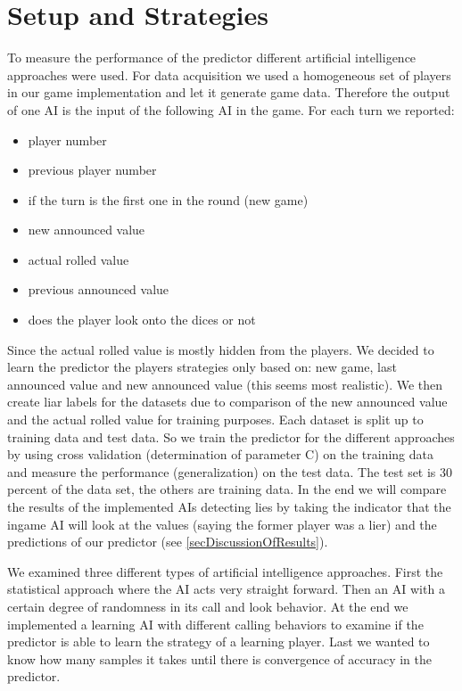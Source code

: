 \documentclass[11pt]{article}
\begin{document}
\section{Setup and Strategies}
\label{sec:setstrat}
To measure the performance of the predictor different artificial intelligence approaches were used. For data acquisition we used a homogeneous set of players in our game implementation and let it generate game data. 
Therefore the output of one AI is the input of the following AI in the game.
For each turn we reported:
\begin{itemize}
	\item player number
	\item previous player number
	\item if the turn is the first one in the round (new game)
	\item new announced value
	\item actual rolled value
	\item previous announced value
	\item does the player look onto the dices or not
\end{itemize}
Since the actual rolled value is mostly hidden from the players. We decided to learn the predictor the players strategies only based on: new game, last announced value and new announced value (this seems most realistic).
We then create liar labels for the datasets due to comparison of the new announced value and the actual rolled value for training purposes.
Each dataset is split up to training data and test data. So we train the predictor for the different approaches by using cross validation (determination of parameter C) on the training data and measure the performance (generalization) on the test data. The test set is 30 percent of the data set, the others are training data.
In the end we will compare the results of the implemented AIs detecting lies by taking the indicator that the ingame AI will look at the values (saying the former player was a lier) and the predictions of our predictor (see \cref{secDiscussionOfResults}).

We examined three different types of artificial intelligence approaches. First the statistical approach where the AI acts very straight forward. Then an AI with a certain degree of randomness in its call and look behavior. At the end we implemented a learning AI with different calling behaviors to examine if the predictor is able to learn the strategy of a learning player. Last we wanted to know how many samples it takes until there is convergence of accuracy in the predictor. 
\end{document}
